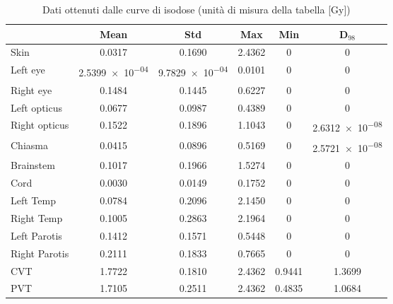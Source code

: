 \documentclass[a4paper,12pt]{article}
\begin{document}
                \begin{table}[H]
                        \centering
                        \label{tab:dati_malposizionamento_carbon}
                        \begin{tabular}{
                            l | c | c | c | c | c |
                        }
                            \toprule
                            & Mean & Std & Max & Min & D$_{98}$ \\
                            \midrule
                            Skin & 0.0317 & 0.1690 & 2.4362 & 0 & 0 \\
                            Left eye & \num{2.5399e-04} & \num{9.7829e-04} & 0.0101 & 0 & 0 \\
                            Right eye & 0.1484 & 0.1445 & 0.6227 & 0 & 0 \\
                            Left opticus & 0.0677 & 0.0987 & 0.4389 & 0 & 0 \\
                            Right opticus & 0.1522 & 0.1896 & 1.1043 & 0 & \num{2.6312e-08} \\
                            Chiasma & 0.0415 & 0.0896 & 0.5169 & 0 & \num{2.5721e-08} \\
                            Brainstem & 0.1017 & 0.1966 & 1.5274 & 0 & 0 \\
                            Cord & 0.0030 & 0.0149 & 0.1752 & 0 & 0 \\
                            Left Temp & 0.0784 & 0.2096 & 2.1450 & 0 & 0 \\
                            Right Temp & 0.1005 & 0.2863 & 2.1964 & 0 & 0 \\
                            Left Parotis & 0.1412 & 0.1571 & 0.5448 & 0 & 0 \\
                            Right Parotis & 0.2111 & 0.1833 & 0.7665 & 0 & 0 \\
                            CVT & 1.7722 & 0.1810 & 2.4362 & 0.9441 & 1.3699 \\
                            PVT & 1.7105 & 0.2511 & 2.4362 & 0.4835 & 1.0684 \\
                            \bottomrule
                        \end{tabular}
                        \caption{Dati ottenuti dalle curve di isodose (unità di misura della tabella [\unit{\gray}])}
                    \end{table}    

\end{document}
